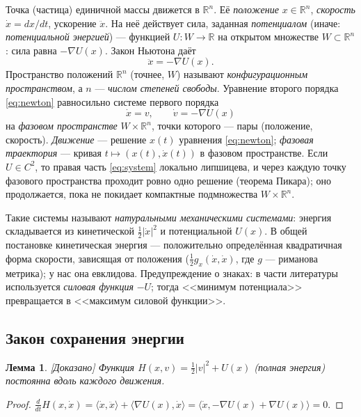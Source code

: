 \documentclass[11pt,a4paper]{article}
\newtheorem{lemma}[theorem]{Лемма}
\theoremstyle{definition}
\newcommand{\R}{\mathbb R}
\newcommand{\mk}[1]{\textsf{[#1]}}
\newcommand{\term}[1]{\emph{#1}}
\begin{document}
Точка (частица) единичной массы движется в $\R^n$. Её \term{положение} $x\in\R^n$, \term{скорость}
$\dot x=dx/dt$, ускорение $\ddot x$. На неё действует сила, заданная \term{потенциалом} (иначе:
\term{потенциальной энергией}) --- функцией $U\colon W\to\R$ на открытом множестве $W\subset\R^n$:
сила равна $-\nabla U(x)$. Закон Ньютона даёт
\begin{equation}\label{eq:newton}
\ddot x=-\nabla U(x).
\end{equation}
Пространство положений $\R^n$ (точнее, $W$) называют \term{конфигурационным пространством},
а $n$ --- \term{числом степеней свободы}. Уравнение второго порядка \eqref{eq:newton}
равносильно системе первого порядка
\begin{equation}\label{eq:system}
\dot x=v,\qquad \dot v=-\nabla U(x)
\end{equation}
на \term{фазовом пространстве} $W\times\R^n$, точки которого --- пары (положение, скорость).
\term{Движение} --- решение $x(t)$ уравнения \eqref{eq:newton}; \term{фазовая траектория} ---
кривая $t\mapsto(x(t),\dot x(t))$ в фазовом пространстве. Если $U\in C^2$, то правая часть
\eqref{eq:system} локально липшицева, и через каждую точку фазового пространства проходит
ровно одно решение (теорема Пикара); оно продолжается, пока не покидает компактные подмножества
$W\times\R^n$.

Такие системы называют \term{натуральными механическими системами}: энергия складывается из
кинетической $\tfrac12|\dot x|^2$ и потенциальной $U(x)$. В общей постановке кинетическая
энергия --- положительно определённая квадратичная форма скорости, зависящая от положения
($\tfrac12 g_x(\dot x,\dot x)$, где $g$ --- риманова метрика); у нас она евклидова. Предупреждение
о знаках: в части литературы используется \term{силовая функция} $-U$; тогда <<минимум
потенциала>> превращается в <<максимум силовой функции>>.

\subsection{Закон сохранения энергии}

\begin{lemma}\label{lem:energy}
\mk{Доказано} Функция $H(x,v)=\tfrac12|v|^2+U(x)$ (\term{полная энергия}) постоянна вдоль
каждого движения.
\end{lemma}
\begin{proof}
$\frac{d}{dt}H(x,\dot x)=\langle\dot x,\ddot x\rangle+\langle\nabla U(x),\dot x\rangle
=\langle\dot x,-\nabla U(x)+\nabla U(x)\rangle=0$.
\end{proof}
\end{document}
